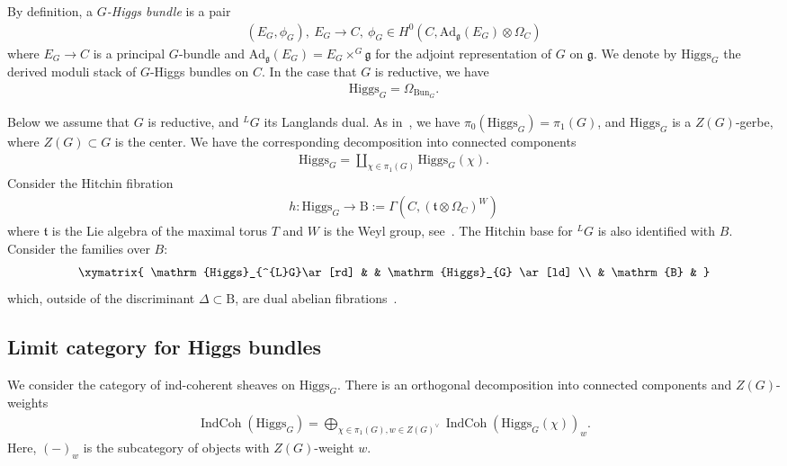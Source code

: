 \documentclass [11pt,oneside,a4paper,mathscr]{amsart}
\theoremstyle{definition}
\newcommand{\IndCoh}{\operatorname{IndCoh}}
\newcommand{\Hig}{\mathrm{Higgs}}
\newcommand{\Bun}{\mathrm{Bun}}
\begin{document}
By definition, a \textit{$G$-Higgs bundle} is a pair 
\begin{align}\label{def:higgs}
(E_G, \phi_G), \ E_G\to C, \ \phi_G \in H^0(C, \mathrm{Ad}_{\mathfrak{g}}(E_G)\otimes \Omega_C)
\end{align}
where $E_G\to C$ is a principal $G$-bundle
and $\mathrm{Ad}_{\mathfrak{g}}(E_G)=E_G\times^G \mathfrak{g}$ for the adjoint 
representation of $G$ on $\mathfrak{g}$. 
We denote by $\Hig_G$ the derived moduli stack of $G$-Higgs bundles on $C$.
In the case that $G$ is reductive, we have 
\begin{align*}
    \Hig_G=\Omega_{\Bun_G}.
\end{align*}

Below we assume that $G$ is reductive, and $^{L}G$ its Langlands dual. 
As in~\cite{DoPa}, we have $\pi_0(\Hig_G)=\pi_1(G)$, 
and $\Hig_G$ is a $Z(G)$-gerbe, where $Z(G) \subset G$ is the 
center. 
We have the corresponding decomposition 
into connected components 
\begin{align*}
    \Hig_G=\coprod_{\chi \in \pi_1(G)}\Hig_G(\chi). 
\end{align*}
Consider the Hitchin fibration 
\begin{align*}%
    h \colon \Hig_G \to \mathrm{B}:=\Gamma(C, (\mathfrak{t}\otimes \Omega_C)^W)
\end{align*}
where $\mathfrak{t}$ is the Lie algebra of the maximal torus $T$ and $W$ is the Weyl group, 
see~\cite[Section~3]{DPlecture}. The Hitchin base for $^{L}G$ is also identified with $B$.
Consider the families over $B$:
 \begin{align}\label{dia:Hitchin} \xymatrix{ \Hig_{^{L}G}\ar[rd] & & \Hig_{G} \ar[ld] \\ & \mathrm{B} & } \end{align} which, outside of the discriminant $\Delta \subset \mathrm{B}$, 
 are dual abelian fibrations~\cite[Theorem~A]{DoPa}.


\subsection{Limit category for Higgs bundles}

We consider the category of ind-coherent sheaves on $\Hig_G$. 
There is an orthogonal decomposition into connected components and 
$Z(G)$-weights
\begin{align*}
    \IndCoh(\Hig_G)=\bigoplus_{\chi \in \pi_1(G), w\in Z(G)^{\vee}}
    \IndCoh(\Hig_G(\chi))_{w}.
\end{align*}
Here, $(-)_w$ is the subcategory of objects with $Z(G)$-weight $w$. 
\end{document}
